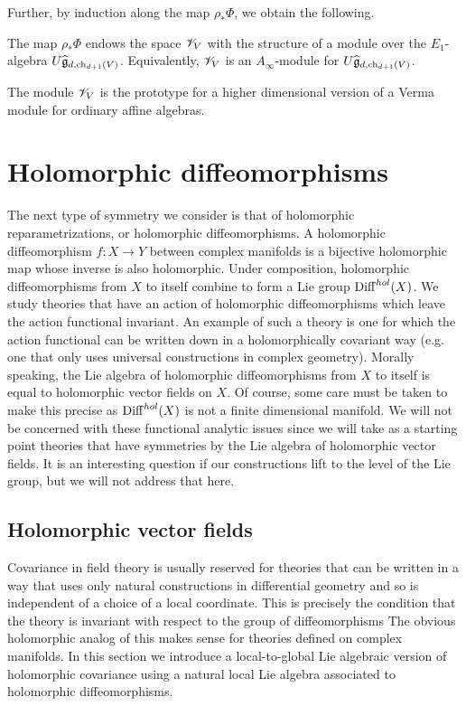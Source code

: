 \documentclass[10pt]{amsart}
\begin{document}
Further, by induction along the map $\rho_* \Phi$, we obtain the following.

\begin{prop}
The map $\rho_*\Phi$ endows the space $\mathscr V_V$ with the structure of a module over the $E_1$-algebra $U \widehat{\mathfrak g}_{d, {\rm ch}_{d+1}(V)}$.
Equivalently, $\mathscr V_V$ is an $A_\infty$-module for $U \widehat{\mathfrak g}_{d, {\rm ch}_{d+1}(V)}$. 
\end{prop}

The module $\mathscr V_V$ is the prototype for a higher dimensional version of a Verma module for ordinary affine algebras. 

\section{Holomorphic diffeomorphisms}

The next type of symmetry we consider is that of holomorphic reparametrizations, or holomorphic diffeomorphisms. 
A holomorphic diffeomorphism $f : X \to Y$ between complex manifolds is a bijective holomorphic map whose inverse is also holomorphic.
Under composition, holomorphic diffeomorphisms from $X$ to itself combine to form a Lie group ${\rm Diff}^{hol}(X)$.
We study theories that have an action of holomorphic diffeomorphisms which leave the action functional invariant.
An example of such a theory is one for which the action functional can be written down in a holomorphically covariant way (e.g. one that only uses universal constructions in complex geometry). 
Morally speaking, the Lie algebra of holomorphic diffeomorphisms from $X$ to itself is equal to holomorphic vector fields on $X$.
Of course, some care must be taken to make this precise as ${\rm Diff}^{hol}(X)$ is not a finite dimensional manifold.
We will not be concerned with these functional analytic issues since we will take as a starting point theories that have symmetries by the Lie algebra of holomorphic vector fields. 
It is an interesting question if our constructions lift to the level of the Lie group, but we will not address that here.

\subsection{Holomorphic vector fields}

Covariance in field theory is usually reserved for theories that can be written in a way that uses only natural constructions in differential geometry and so is independent of a choice of a local coordinate. 
This is precisely the condition that the theory is invariant with respect to the group of diffeomorphisms
The obvious holomorphic analog of this makes sense for theories defined on complex manifolds. 
In this section we introduce a local-to-global Lie algebraic version of holomorphic covariance using a natural local Lie algebra associated to holomorphic diffeomorphisms.
\end{document}
